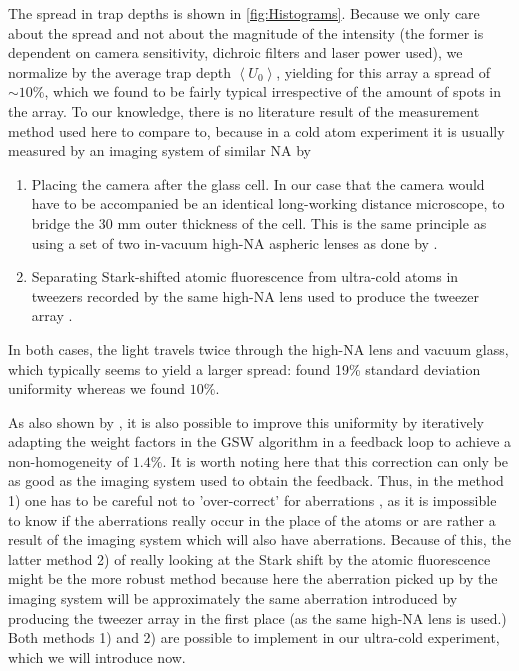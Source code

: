 The spread in trap depths is shown in \cref{fig:Histograms}.
Because we only care about the spread and not about the magnitude of the intensity (the former is dependent on camera sensitivity, dichroic filters and laser power used), we normalize by the average trap depth $\left\langle U_0 \right\rangle$, yielding for this array a spread of $\sim 10$\%, which we found to be fairly typical irrespective of the amount of spots in the array.
To our knowledge, there is no literature result of the measurement method used here to compare to, because in a cold atom experiment it is usually measured by an imaging system of similar \ac{NA} by

\begin{enumerate}
    \item Placing the camera after the glass cell. 
    In our case that the camera would have to be accompanied be an identical long-working distance microscope, to bridge the 30 mm outer thickness of the cell.
    This is the same principle as using a set of two in-vacuum high-NA aspheric lenses as done by \cite{Nogrette2014}.
    
    \item Separating Stark-shifted atomic fluorescence from ultra-cold atoms in tweezers recorded by the same high-NA lens used to produce the tweezer array \cite{Ebadi2021}.
\end{enumerate}
In both cases, the light travels twice through the high-NA lens and vacuum glass, which typically seems to yield a larger spread: \cite{Nogrette2014} found 19\% standard deviation uniformity whereas we found $10\%$.

As also shown by \cite{Nogrette2014}, it is also possible to improve this uniformity by iteratively adapting the weight factors in the \ac{GSW} algorithm in a feedback loop to achieve a non-homogeneity of $1.4\%$.
It is worth noting here that this correction can only be as good as the imaging system used to obtain the feedback. 
Thus, in the method 1) one has to be careful not to 'over-correct' for aberrations \cite{Labuhn2016}, as it is impossible to know if the aberrations really occur in the place of the atoms or are rather a result of the imaging system which will also have aberrations. 
Because of this, the latter method 2) of really looking at the Stark shift by the atomic fluorescence might be the more robust method because here the aberration picked up by the imaging system will be approximately the same aberration introduced by producing the tweezer array in the first place (as the same high-NA lens is used.)
Both methods 1) and 2) are possible to implement in our ultra-cold experiment, which we will introduce now.







